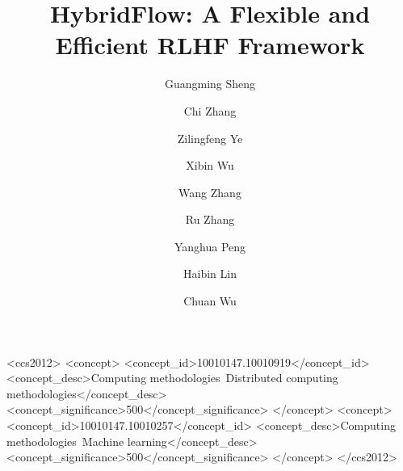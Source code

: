 \documentclass[sigplan,10pt]{acmart}
\begin{document}
\title{HybridFlow: A Flexible and Efficient RLHF Framework}
\renewcommand{\shorttitle}{HybridFlow: A Flexible and Efficient RLHF Framework}

\author{Guangming Sheng}

\author{Chi Zhang}

\author{Zilingfeng Ye}

\author{Xibin Wu}

\author{Wang Zhang}

\author{Ru Zhang}

\author{Yanghua Peng}

\author{Haibin Lin}

\author{Chuan Wu}


\renewcommand{\shortauthors}{G. Sheng, C. Zhang, Z. Ye, X. Wu, W. Zhang, R. Zhang, P. Yang, H. Lin, C. Wu}

\begin{CCSXML}
<ccs2012>
   <concept>
       <concept_id>10010147.10010919</concept_id>
       <concept_desc>Computing methodologies~Distributed computing methodologies</concept_desc>
       <concept_significance>500</concept_significance>
       </concept>
   <concept>
       <concept_id>10010147.10010257</concept_id>
       <concept_desc>Computing methodologies~Machine learning</concept_desc>
       <concept_significance>500</concept_significance>
       </concept>
 </ccs2012>
\end{CCSXML}


\end{document}

